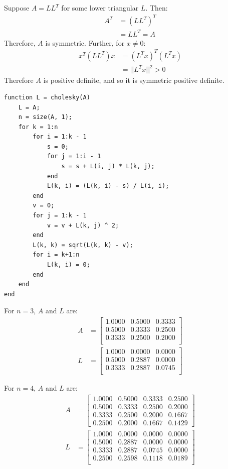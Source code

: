 \documentclass{article}
\begin{document}
Suppose $A = LL^T$ for some lower triangular $L$. Then:
\begin{align*}
    A^T & = (LL^T)^T \\
    & = LL^T = A
\end{align*}
Therefore, $A$ is symmetric. Further, for $x \neq 0$:
\begin{align*}
    x^T(LL^T)x & = (L^Tx)^T(L^Tx) \\
    & = ||L^Tx||^2 > 0
\end{align*}
Therefore $A$ is positive definite, and so it is symmetric positive definite.
\begin{lstlisting}
function L = cholesky(A)
    L = A;
    n = size(A, 1);
    for k = 1:n
        for i = 1:k - 1
            s = 0;
            for j = 1:i - 1
                s = s + L(i, j) * L(k, j);
            end
            L(k, i) = (L(k, i) - s) / L(i, i);
        end
        v = 0;
        for j = 1:k - 1
            v = v + L(k, j) ^ 2;
        end
        L(k, k) = sqrt(L(k, k) - v);
        for i = k+1:n
            L(k, i) = 0;
        end
    end
end
\end{lstlisting}
For $n = 3$, $A$ and $L$ are:
\begin{align*}
    A & = \begin{bmatrix}
        1.0000 & 0.5000 & 0.3333 \\
        0.5000 & 0.3333 & 0.2500 \\
        0.3333 & 0.2500 & 0.2000 \\
    \end{bmatrix} \\
    L & = \begin{bmatrix}
        1.0000 & 0.0000 & 0.0000 \\
        0.5000 & 0.2887 & 0.0000 \\
        0.3333 & 0.2887 & 0.0745 \\
    \end{bmatrix}
\end{align*}

For $n = 4$, $A$ and $L$ are:
\begin{align*}
    A & = \begin{bmatrix}
        1.0000 & 0.5000 & 0.3333 & 0.2500 \\
        0.5000 & 0.3333 & 0.2500 & 0.2000 \\
        0.3333 & 0.2500 & 0.2000 & 0.1667 \\
        0.2500 & 0.2000 & 0.1667 & 0.1429
    \end{bmatrix} \\
    L & = \begin{bmatrix}
        1.0000 & 0.0000 & 0.0000 & 0.0000 \\
        0.5000 & 0.2887 & 0.0000 & 0.0000 \\
        0.3333 & 0.2887 & 0.0745 & 0.0000 \\
        0.2500 & 0.2598 & 0.1118 & 0.0189 \\
    \end{bmatrix}
\end{align*}
\end{document}

